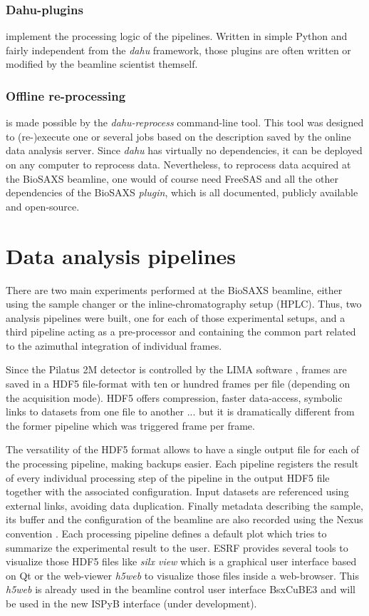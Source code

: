 \documentclass[preprint]{iucr}              %
\begin{document}
\subsubsection{Dahu-plugins} implement the processing logic of the pipelines.
Written in simple Python and fairly independent from the \textit{dahu} framework, those plugins are often written or modified by the beamline scientist themself.

\subsubsection{Offline re-processing}
is made possible by the \textit{dahu-reprocess} command-line tool.
This tool was designed to (re-)execute one or several jobs based on the description saved by the online data analysis server. 
Since \textit{dahu} has virtually no dependencies, it can be deployed on any computer to reprocess data. 
Nevertheless, to reprocess data acquired at the BioSAXS beamline, one would of course need FreeSAS and all the other dependencies of the BioSAXS \textit{plugin}, which is all documented, publicly available and open-source.

\section{Data analysis pipelines}
\label{pipeline}
There are two main experiments performed at the BioSAXS beamline, either using the sample changer or the inline-chromatography setup (HPLC).
Thus, two analysis pipelines were built, one for each of those experimental setups, and a third pipeline acting as a pre-processor and containing the common part related to the azimuthal integration of individual frames.

Since the Pilatus 2M detector is controlled by the LIMA software \cite{lima}, frames are saved in a HDF5 file-format \cite{hdf5} with ten or hundred frames per file (depending on the acquisition mode).
HDF5 offers compression, faster data-access, symbolic links to datasets from one file to another ... but it is dramatically different from the former pipeline which was triggered frame per frame.

The versatility of the HDF5 format allows to have a single output file for each of the processing pipeline, making backups easier.
Each pipeline registers the result of every individual processing step of the pipeline in the output HDF5 file together with the associated configuration.
Input datasets are referenced using external links, avoiding data duplication. 
Finally metadata describing the sample, its buffer and the configuration of the beamline are also recorded using the Nexus convention \cite{nexus}.
Each processing pipeline defines a default plot which tries to summarize the experimental result to the user.
ESRF provides several tools to visualize those HDF5 files like \textit{silx view} \cite{silx} which is a graphical user interface based on Qt \cite{pyqt} or the web-viewer \textit{h5web} \cite{h5web} to visualize those files inside a web-browser.
This \textit{h5web} is already used in the beamline control user interface BsxCuBE3 \cite{bm29_2022} and will be used in the new ISPyB interface (under development).
\end{document}

